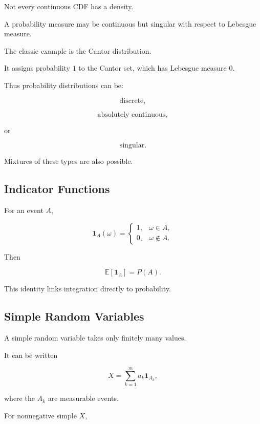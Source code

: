 Not every continuous CDF has a density.

A probability measure may be continuous but singular with respect to
Lebesgue measure.

The classic example is the Cantor distribution.

It assigns probability \(1\) to the Cantor set, which has Lebesgue
measure \(0\).

Thus probability distributions can be:

\[
\boxed{
\text{discrete},
}
\]

\[
\boxed{
\text{absolutely continuous},
}
\]

or

\[
\boxed{
\text{singular}.
}
\]

Mixtures of these types are also possible.

\subsection{Indicator Functions}
\label{subsec:indicator-functions-measure}

For an event \(A\),

\[
\mathbf{1}_A(\omega)
=
\begin{cases}
1,&\omega\in A,\\
0,&\omega\notin A.
\end{cases}
\]

Then

\[
\boxed{
\mathbb{E}[\mathbf{1}_A]
=
P(A).
}
\]

This identity links integration directly to probability.

\subsection{Simple Random Variables}
\label{subsec:simple-random-variables}

A simple random variable takes only finitely many values.

It can be written

\[
\boxed{
X
=
\sum_{k=1}^{m}
a_k
\mathbf{1}_{A_k},
}
\]

where the \(A_k\) are measurable events.

For nonnegative simple \(X\),

